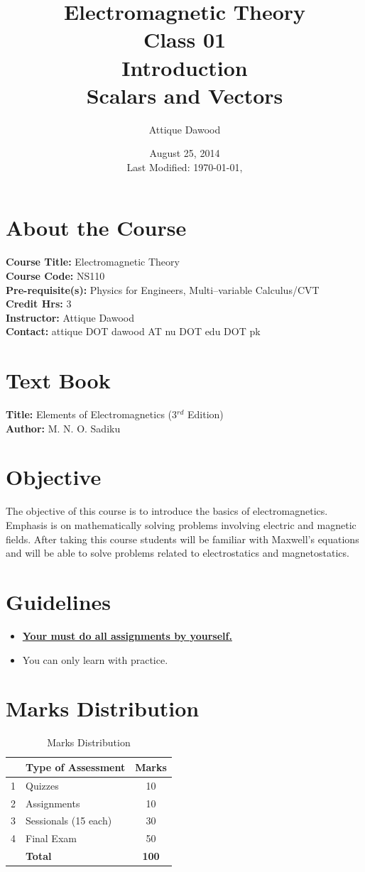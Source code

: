 \documentclass[12pt,a4paper]{article}
\title{Electromagnetic Theory\\Class 01\\Introduction\\Scalars and Vectors}
\author{Attique Dawood}
\date{August 25, 2014\\[0.2cm] Last Modified: \today, \currenttime}
\begin{document}
\maketitle
\section{About the Course}
\textbf{Course Title:} Electromagnetic Theory\\
\textbf{Course Code:} NS110\\
\textbf{Pre-requisite(s):} Physics for Engineers, Multi--variable Calculus/CVT\\
\textbf{Credit Hrs:} 3\\
\textbf{Instructor:} Attique Dawood\\
\textbf{Contact:} attique DOT dawood AT nu DOT edu DOT pk\\
\section{Text Book}
\textbf{Title:} Elements of Electromagnetics (3$^{rd}$ Edition)\\
\textbf{Author:} M. N. O. Sadiku\\
\section{Objective}
The objective of this course is to introduce the basics of electromagnetics. Emphasis is on mathematically solving problems involving electric and magnetic fields. After taking this course students will be familiar with Maxwell’s equations and will be able to solve problems related to electrostatics and magnetostatics.
\section{Guidelines}
\begin{itemize}
\item \textbf{\underline{Your must do all assignments by yourself.}}
\item You can only learn with practice.
\end{itemize}
\section{Marks Distribution}
\begin{table}[H]
\begin{center}
\vspace{0.3cm}
	\begin{tabular}{llc}
	\hline \hline
		\rule{0pt}{2.6ex} & \textbf{Type of Assessment} & \textbf{Marks}\\
		\hline
		1 \rule{0pt}{2.6ex} & Quizzes & 10\\
		2 & Assignments& 10\\
		3 & Sessionals (15 each) & 30\\
		4 & Final Exam & 50\\
	\hline \hline
	\rule{0pt}{2.6ex} & \textbf{Total} & \textbf{100}\\
	\hline \hline
	\end{tabular}
\end{center}
\label{Marks Distribution}
\caption{Marks Distribution}
\end{table}
\end{document}
